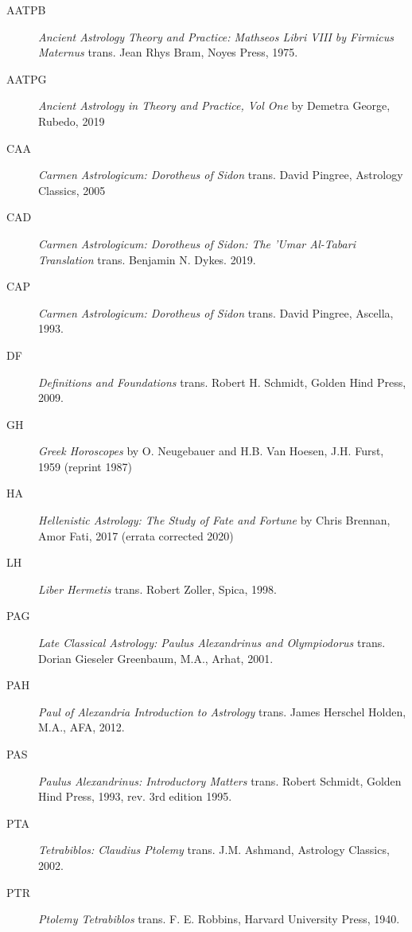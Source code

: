 \begin{description}
\item[AATPB]
	\textsl{Ancient Astrology Theory and Practice: Mathseos Libri VIII by Firmicus Maternus} trans. Jean Rhys Bram, Noyes Press, 1975.	
	
\item[AATPG] \textsl{Ancient Astrology in Theory and Practice, Vol One} by Demetra George, Rubedo, 2019

\item[CAA]
	\textsl{Carmen Astrologicum: Dorotheus of Sidon} trans. David Pingree, Astrology Classics, 2005

\item[CAD]
	\textsl{Carmen Astrologicum: Dorotheus of Sidon: The 'Umar Al-Tabari Translation} trans. Benjamin N. Dykes. 2019.

\item[CAP]
	\textsl{Carmen Astrologicum: Dorotheus of Sidon} trans. David Pingree, Ascella, 1993.

\item[DF]
	\textsl{Definitions and Foundations} trans. Robert H. Schmidt, Golden Hind Press, 2009.
	
\item[GH] 
	\textsl{Greek Horoscopes} by O. Neugebauer and H.B. Van Hoesen, J.H. Furst, 1959 (reprint 1987)
	
\item[HA] 
	\textsl{Hellenistic Astrology: The Study of Fate and Fortune} by Chris Brennan, Amor Fati, 2017 (errata corrected 2020)
	
\item[LH]
	\textsl{Liber Hermetis} trans. Robert Zoller, Spica, 1998.
	
\item[PAG] 
	\textsl{Late Classical Astrology: Paulus Alexandrinus and Olympiodorus} trans. Dorian Gieseler Greenbaum, M.A., Arhat, 2001.

\item[PAH] 
	\textsl{Paul of Alexandria Introduction to Astrology} trans. James Herschel Holden, M.A., AFA, 2012.

\item[PAS] 
	\textsl{Paulus Alexandrinus: Introductory Matters} trans. Robert Schmidt, Golden Hind Press, 1993, rev. 3rd edition 1995.
	
\item[PTA]
	\textsl{Tetrabiblos: Claudius Ptolemy} trans. J.M. Ashmand, Astrology Classics, 2002.
	
\item[PTR]
	\textit{Ptolemy Tetrabiblos} trans.  F. E. Robbins, Harvard University Press, 1940.
	

\end{description}
